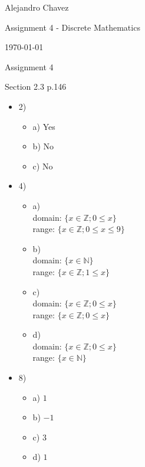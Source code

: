 \documentclass{article}
\begin{document}
\hfill Alejandro Chavez

\hfill Assignment 4 - Discrete Mathematics

\hfill \today\\

\begin{center}\begin{large}Assignment 4\end{large}\end{center}	Section 2.3 p.146
\begin{itemize}
	\item
		2) 
    \begin{itemize}
      \item
        a)
        Yes
      \item
        b)
        No
      \item
        c)
        No
    \end{itemize}
	\item
		4)
    \begin{itemize}
      \item
        a)\\
        domain: $\{x\in \mathbb{Z}; 0\le x\}$\\
        range: $\{x\in \mathbb{Z}; 0\le x \le 9\}$
      \item
        b)\\
        domain: $\{x\in \mathbb{N}\}$\\
        range: $\{x\in \mathbb{Z}; 1\le x\}$\\
      \item
        c)\\
        domain: $\{x\in \mathbb{Z}; 0\le x\}$\\
        range: $\{x\in \mathbb{Z}; 0\le x\}$\\
      \item
        d)\\
        domain: $\{x\in \mathbb{Z}; 0\le x\}$\\
        range: $\{x\in \mathbb{N}\}$\\
    \end{itemize}
	\item
		8)
    \begin{itemize}
      \item
        a) $1$
      \item
        b) $-1$
      \item
        c) $3$
      \item
        d) $1$
    \end{itemize}

\end{itemize}
\end{document}
